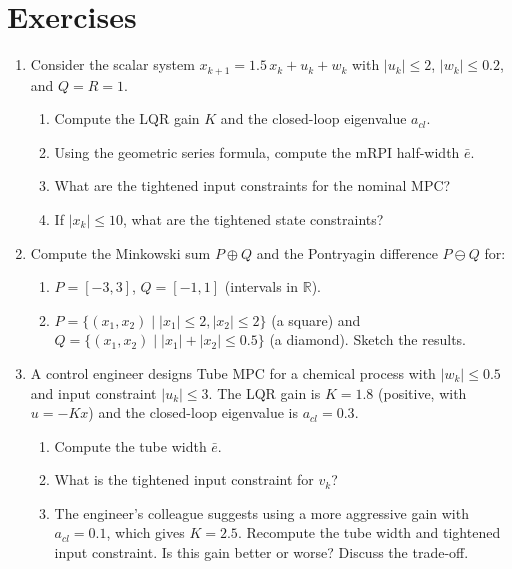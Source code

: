 \section*{Exercises}
\begin{enumerate}

	\item Consider the scalar system $x_{k+1} = 1.5\,x_k + u_k + w_k$ with $|u_k| \le 2$, $|w_k| \le 0.2$, and $Q = R = 1$.
	\begin{enumerate}
		\item Compute the LQR gain $K$ and the closed-loop eigenvalue $a_{cl}$.
		\item Using the geometric series formula, compute the mRPI half-width $\bar{e}$.
		\item What are the tightened input constraints for the nominal MPC?
		\item If $|x_k| \le 10$, what are the tightened state constraints?
	\end{enumerate}

	\item Compute the Minkowski sum $P \oplus Q$ and the Pontryagin difference $P \ominus Q$ for:
	\begin{enumerate}
		\item $P = [-3, 3]$, $Q = [-1, 1]$ (intervals in $\mathbb{R}$).
		\item $P = \{(x_1, x_2) \mid |x_1| \le 2, |x_2| \le 2\}$ (a square) and $Q = \{(x_1, x_2) \mid |x_1| + |x_2| \le 0.5\}$ (a diamond). Sketch the results.
	\end{enumerate}

	\item A control engineer designs Tube MPC for a chemical process with $|w_k| \le 0.5$ and input constraint $|u_k| \le 3$. The LQR gain is $K = 1.8$ (positive, with $u = -Kx$) and the closed-loop eigenvalue is $a_{cl} = 0.3$.
	\begin{enumerate}
		\item Compute the tube width $\bar{e}$.
		\item What is the tightened input constraint for $v_k$?
		\item The engineer's colleague suggests using a more aggressive gain with $a_{cl} = 0.1$, which gives $K = 2.5$. Recompute the tube width and tightened input constraint. Is this gain better or worse? Discuss the trade-off.
	\end{enumerate}


\end{enumerate}
